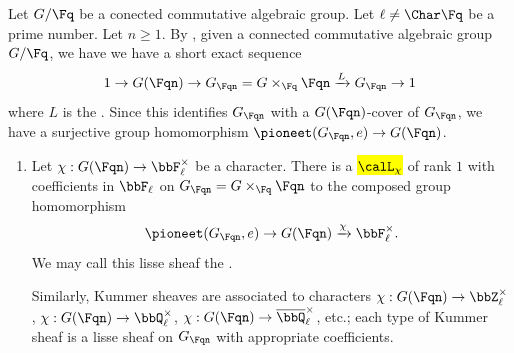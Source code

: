 \begin{definition} \label{definition:kummer_sheaf_associated_to_a_character_on_points_of_a_connected_commutative_algebraic_group_over_a_finite_field}
    Let $G/\Fq$ be a conected commutative algebraic group. Let $\ell \neq \Char \Fq$ be a prime number. Let $n \geq 1$.
    By , given a connected commutative algebraic group $G/\Fq$, we have we have a short exact sequence
    $$1 \to G(\Fqn) \to G_{\Fqn} = G \times_{\Fq} \Fqn \xrightarrow{L} G_{\Fqn} \to 1$$
    where $L$ is the . Since this identifies $G_{\Fqn}$ with a  $G(\Fqn)$-cover of $G_{\Fqn}$, we have a  surjective group homomorphism $\pioneet(G_{\Fqn}, e) \to G(\Fqn)$. 
    
    \begin{enumerate}
        \item Let $\chi: G(\Fqn) \to \bbF_\ell^\times$ be a character. There is a  \hl{$\calL_\chi$} of rank $1$ with coefficients in $\bbF_\ell$ on $G_{\Fqn} = G \times_{\Fq} \Fqn$  to the composed group homomorphism
        $$\pioneet(G_{\Fqn}, e) \to G(\Fqn) \xrightarrow{\chi} \bbF_\ell^\times.$$
        We may call this lisse sheaf the .

        Similarly, Kummer sheaves are associated to characters $\chi: G(\Fqn) \to \bbZ_\ell^\times$, $\chi: G(\Fqn) \to \bbQ_\ell^\times$, $\chi: G(\Fqn) \to \overline{\bbQ}_\ell^\times$, etc.; each type of Kummer sheaf is a lisse sheaf on $G_{\Fqn}$ with appropriate coefficients.
    \end{enumerate}

\end{definition}